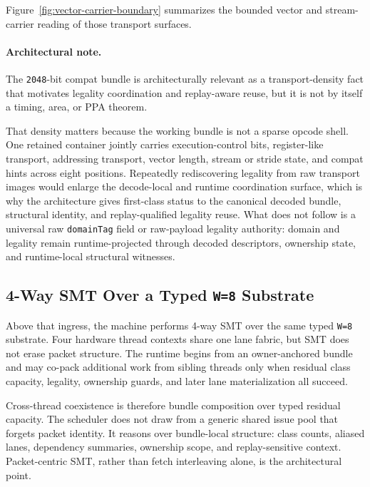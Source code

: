 \documentclass[twocolumn]{article}
\begin{document}
Figure~\ref{fig:vector-carrier-boundary} summarizes the bounded vector and stream-carrier reading of those transport surfaces.



\paragraph{Architectural note.}
The \texttt{2048}-bit compat bundle is architecturally relevant as a transport-density fact that motivates legality coordination and replay-aware reuse, but it is not by itself a timing, area, or PPA theorem.

That density matters because the working bundle is not a sparse opcode shell. One retained container jointly carries execution-control bits, register-like transport, addressing transport, vector length, stream or stride state, and compat hints across eight positions. Repeatedly rediscovering legality from raw transport images would enlarge the decode-local and runtime coordination surface, which is why the architecture gives first-class status to the canonical decoded bundle, structural identity, and replay-qualified legality reuse. What does not follow is a universal raw \texttt{domainTag} field or raw-payload legality authority: domain and legality remain runtime-projected through decoded descriptors, ownership state, and runtime-local structural witnesses.


\subsection{4-Way SMT Over a Typed \texttt{W=8} Substrate}

Above that ingress, the machine performs 4-way SMT over the same typed \texttt{W=8} substrate. Four hardware thread contexts share one lane fabric, but SMT does not erase packet structure. The runtime begins from an owner-anchored bundle and may co-pack additional work from sibling threads only when residual class capacity, legality, ownership guards, and later lane materialization all succeed.

Cross-thread coexistence is therefore bundle composition over typed residual capacity. The scheduler does not draw from a generic shared issue pool that forgets packet identity. It reasons over bundle-local structure: class counts, aliased lanes, dependency summaries, ownership scope, and replay-sensitive context. Packet-centric SMT, rather than fetch interleaving alone, is the architectural point.
\end{document}
